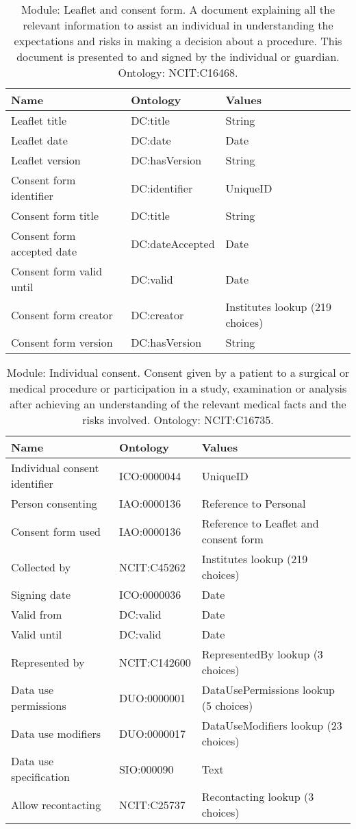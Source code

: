 \documentclass{article}
\begin{document}
\begin{table}[htb]
\begin{tabular}{lll}
Name & Ontology & Values \\
\hline
Leaflet title & DC:title & String \\
Leaflet date & DC:date & Date \\
Leaflet version & DC:hasVersion & String \\
Consent form identifier & DC:identifier & UniqueID \\
Consent form title & DC:title & String \\
Consent form accepted date & DC:dateAccepted & Date \\
Consent form valid until & DC:valid & Date \\
Consent form creator & DC:creator & Institutes lookup (219 choices) \\
Consent form version & DC:hasVersion & String \\
\hline
\end{tabular}
\caption[Module: Leaflet and consent form]{\label{table:table4} Module: Leaflet and consent form. A document explaining all the relevant information to assist an individual in understanding the expectations and risks in making a decision about a procedure. This document is presented to and signed by the individual or guardian. Ontology: NCIT:C16468. }
\end{table}

\begin{table}[htb]
\begin{tabular}{lll}
Name & Ontology & Values \\
\hline
Individual consent identifier & ICO:0000044 & UniqueID \\
Person consenting & IAO:0000136 & Reference to Personal \\
Consent form used & IAO:0000136 & Reference to Leaflet and consent form \\
Collected by & NCIT:C45262 & Institutes lookup (219 choices) \\
Signing date & ICO:0000036 & Date \\
Valid from & DC:valid & Date \\
Valid until & DC:valid & Date \\
Represented by & NCIT:C142600 & RepresentedBy lookup (3 choices) \\
Data use permissions & DUO:0000001 & DataUsePermissions lookup (5 choices) \\
Data use modifiers & DUO:0000017 & DataUseModifiers lookup (23 choices) \\
Data use specification & SIO:000090 & Text \\
Allow recontacting & NCIT:C25737 & Recontacting lookup (3 choices) \\
\hline
\end{tabular}
\caption[Module: Individual consent]{\label{table:table5} Module: Individual consent. Consent given by a patient to a surgical or medical procedure or participation in a study, examination or analysis after achieving an understanding of the relevant medical facts and the risks involved. Ontology: NCIT:C16735. }
\end{table}
\end{document}
